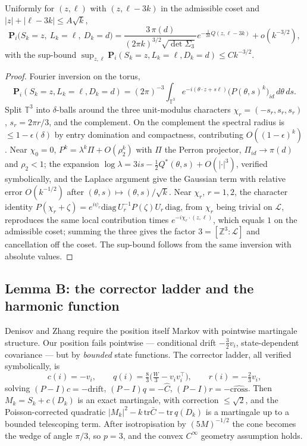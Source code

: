 \documentclass[11pt]{article}
\theoremstyle{definition}
\newcommand{\Lat}{\mathcal{L}}
\renewcommand{\Pr}{\mathbf{P}}
\begin{document}
Uniformly for $(z,\ell)$ with $(z,\ell-3k)$ in the admissible coset and
$|z|+|\ell-3k|\le A\sqrt k$,
\[
  \Pr_{i}\bigl(S_k=z,\ L_k=\ell,\ D_k=d\bigr)
  =\frac{3\,\pi(d)}{(2\pi k)^{3/2}\sqrt{\det\Sigma_3}}
   e^{-\frac{1}{2k}Q(z,\ell-3k)}+o(k^{-3/2}),
\]
with the sup-bound $\sup_{z,\ell}\Pr_i(S_k=z,L_k=\ell,D_k=d)\le Ck^{-3/2}$.

\begin{proof}
Fourier inversion on the torus,
\[
  \Pr_i(S_k=z,L_k=\ell,D_k=d)=(2\pi)^{-3}\int_{\mathbb{T}^{3}}
  e^{-i(\theta\cdot z+s\ell)}\bigl(P(\theta,s)^{k}\bigr)_{id}\,d\theta\,ds .
\]
Split
$\mathbb{T}^{3}$ into $\delta$-balls around the three unit-modulus characters
$\chi_r=(-s_r,s_r,s_r)$, $s_r=2\pi r/3$, and the complement. On the complement
the spectral radius is $\le1-\epsilon(\delta)$ by entry domination and
compactness, contributing $O((1-\epsilon)^{k})$. Near $\chi_0=0$,
$P^{k}=\lambda^{k}\Pi+O(\rho_2^{k})$ with $\Pi$ the Perron projector,
$\Pi_{id}\to\pi(d)$ and $\rho_2<1$; the expansion
$\log\lambda=3is-\tfrac12Q^{*}(\theta,s)+O(|\cdot|^{3})$, verified
symbolically, and the Laplace argument give the Gaussian term with relative
error $O(k^{-1/2})$ after $(\theta,s)\mapsto(\theta,s)/\sqrt k$. Near $\chi_r$,
$r=1,2$, the character identity
$P(\chi_r+\zeta)=e^{i\psi_r}\mathrm{diag}\,U_r^{-1}P(\zeta)U_r\,\mathrm{diag}$,
from $\chi_r$ being trivial on $\Lat$, reproduces the same local contribution
times $e^{-i\chi_r\cdot(z,\ell)}$, which equals $1$ on the admissible coset;
summing the three gives the factor $3=[\mathbb{Z}^{3}:\Lat]$ and cancellation
off the coset. The sup-bound follows from the same inversion with absolute
values.
\end{proof}

\subsection{Lemma B: the corrector ladder and the harmonic function}

Denisov and Zhang require the position itself Markov with pointwise martingale
structure. Our position fails pointwise --- conditional drift $-\tfrac32v_i$,
state-dependent covariance --- but by \emph{bounded} state functions. The
corrector ladder, all verified symbolically, is
\[
  c(i)=-v_i,\qquad q(i)=\tfrac83\bigl(\tfrac W3-v_iv_i^{\top}\bigr),
  \qquad r(i)=-\tfrac23v_i,
\]
solving $(P-I)c=-\mathrm{drift}$, $(P-I)q=-\widehat C$,
$(P-I)r=-\widehat{\mathrm{cross}}$. Then $M_k=S_k+c(D_k)$ is an exact
martingale, with correction $\le\sqrt2$, and the Poisson-corrected quadratic
$|M_k|^{2}-k\,\mathrm{tr}\bar C-\mathrm{tr}\,q(D_k)$ is a martingale up to a
bounded telescoping term. After isotropisation by $(5M)^{-1/2}$ the cone
becomes the wedge of angle $\pi/3$, so $p=3$, and the convex $C^{\infty}$
geometry assumption holds.
\end{document}
